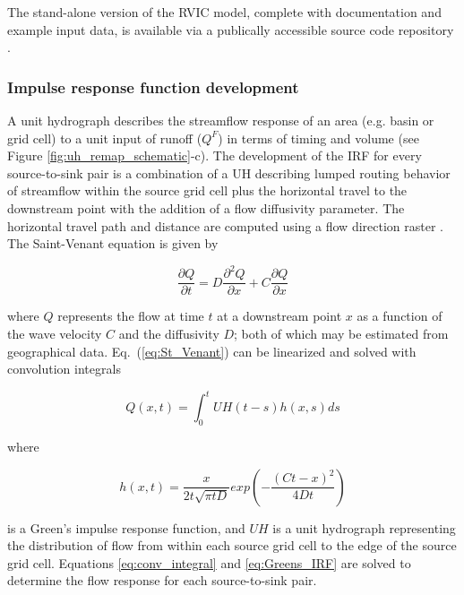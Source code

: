 \documentclass[jgrga, draft]{agutex}
\begin{document}
\begin{article}
The stand-alone version of the RVIC model, complete with documentation and example input data, is available via a publically accessible source code repository \citep{Hamman_2015}. %

\subsubsection{Impulse response function development}
\label{sec:irfs}

A unit hydrograph describes the streamflow response of an area (e.g. basin or grid cell) to a unit input of runoff ($Q^F$) in terms of timing and volume (see Figure \ref{fig:uh_remap_schematic}-c). %
The development of the IRF for every source-to-sink pair is a combination of a UH describing lumped routing behavior of streamflow within the source grid cell plus the horizontal travel to the downstream point with the addition of a flow diffusivity parameter.
The horizontal travel path and distance are computed using a flow direction raster \citep[e.g.][]{Wu_2011}.
The Saint-Venant equation is given by

 \begin{equation}
   \label{eq:St_Venant}
   \frac{\partial Q}{\partial t} = D \frac{\partial^2 Q}{\partial x} + C \frac{\partial Q}{\partial x}
 \end{equation}

where $Q$ represents the flow at time $t$ at a downstream point $x$ as a function of the wave velocity $C$ and the diffusivity $D$; both of which may be estimated from geographical data. Eq.~(\ref{eq:St_Venant}) can be linearized and solved with convolution integrals

 \begin{equation}
   \label{eq:conv_integral}
	  Q(x,t) = \int_0^t UH(t-s)h(x,s)ds
 \end{equation}

where

 \begin{equation}
   \label{eq:Greens_IRF}
	h(x, t) = \frac{x}{2t\sqrt{\pi tD}}exp\left(-\frac{(Ct-x)^2}{4Dt}\right)
 \end{equation}

is a Green's impulse response function, and $UH$ is a unit hydrograph representing the distribution of flow from within each source grid cell to the edge of the source grid cell.
Equations \ref{eq:conv_integral} and \ref{eq:Greens_IRF} are solved to determine the flow response for each source-to-sink pair.


\end{article}
\end{document}
